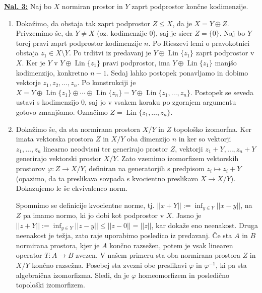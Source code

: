 \documentclass[a4paper, 12pt]{article}
\DeclareMathOperator{\Lin}{Lin}
\begin{document}
\underline{\textbf{Nal. 3:}}
Naj bo $X$ normiran prostor in $Y$ zaprt podprostor končne kodimenzije.
\begin{enumerate}[label=(\alph*)]
	\item Dokažimo, da obstaja tak zaprt podprostor $Z \leq X$, da je $X = Y \oplus Z$.
	Privzemimo še, da $Y \neq X$ (oz. kodimenzije $0$), saj je sicer $Z = \lbrace 0 \rbrace$. Naj bo $Y$ torej pravi zaprt podprostor kodimenzije $n$. Po Rieszevi lemi o pravokotnici obstaja $z_1 \in X\setminus Y$. Po trditvi iz predavanj je $Y \oplus \Lin\lbrace z_1 \rbrace$ zaprt podprostor v $X$. Ker je $Y$ v $Y \oplus \Lin\lbrace z_1 \rbrace$ pravi podprostor, ima $Y \oplus \Lin\lbrace z_1 \rbrace$ manjšo kodimenzijo, konkretno $n-1$.
	Sedaj lahko postopek ponavljamo in dobimo vektorje $z_1, z_2, \dots, z_n$. Po konstrukciji je $X = Y \oplus \Lin\lbrace z_1 \rbrace \oplus \cdots \oplus \Lin\lbrace z_n \rbrace = Y \oplus \Lin\lbrace z_1, \dots, z_n \rbrace$.
	Postopek se seveda ustavi s kodimenzijo $0$, saj jo v vsakem koraku po zgornjem argumentu gotovo zmanjšamo. Označimo $Z = \Lin \lbrace z_1, \dots, z_n \rbrace$.
	\item Dokažimo še, da sta normirana prostora $X/Y$ in $Z$ topološko izomorfna.
	Ker imata vektorska prostora $Z$ in $X/Y$ oba dimenzijo $n$ in ker so vektorji $z_1, \dots, z_n$ linearno neodvisni ter generirajo prostor $Z$, vektorji $z_1 + Y, \dots, z_n + Y$ generirajo vektorski prostor $X/Y$.
	Zato vzemimo izomorfizem vektorskih prostorov $\varphi\colon Z \to X/Y$, definiran na generatorjih s predpisom $z_i \mapsto z_i + Y$ (opazimo, da ta preslikava sovpada s kvocientno preslikavo $X \to X/Y$).
	Dokazujemo le še ekvivalenco norm.
	
	Spomnimo se definicije kvocientne norme, tj. $||x + Y|| := \inf_{y \in Y}||x - y||$, na $Z$ pa imamo normo, ki jo dobi kot podprostor v $X$.
	Jasno je $||z + Y|| := \inf_{y \in Y}||z - y|| \leq ||z - 0|| = ||z||$, kar dokaže eno neenakost.
	Druga neenakost je težja, zato raje uporabimo posledico iz predavanj. Če sta $A$ in $B$ normirana prostora, kjer je $A$ končno razsežen, potem je vsak linearen operator $T\colon A \to B$ zvezen. V našem primeru sta oba normirana prostora $Z$ in $X/Y$ končno razsežna. Posebej sta zvezni obe preslikavi $\varphi$ in $\varphi^{-1}$, ki pa sta algebraična izomorfizma. Sledi, da je $\varphi$ homeomorfizem in posledično topološki izomorfizem.
\end{enumerate}
\end{document}
